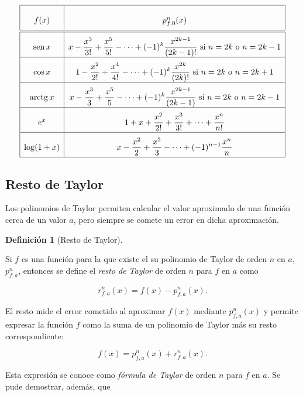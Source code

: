 \documentclass[
  a4paper,
]{scrreport}
\theoremstyle{plain}
\theoremstyle{plain}
\theoremstyle{definition}
\newtheorem{definition}{Definición}[chapter]
\theoremstyle{definition}
\theoremstyle{plain}
\theoremstyle{remark}
\begin{document}
\[
\renewcommand{\arraystretch}{2.5}
\begin{array}{|c|c|}
\hline
f(x) & p_{f,0}^n(x) \\
\hline\hline
\operatorname{sen} x & \displaystyle x-\frac{x^3}{3!}+\frac{x^5}{5!}-\cdots +(-1)^k\frac{x^{2k-1}}{(2k-1)!} \mbox{ si $n=2k$ o $n=2k-1$}\\
\hline
\cos x &  \displaystyle 1-\frac{x^2}{2!}+\frac{x^4}{4!}-\cdots +(-1)^k\frac{x^{2k}}{(2k)!} \mbox{ si $n=2k$ o $n=2k+1$}\\
\hline
\operatorname{arctg} x &  \displaystyle x-\frac{x^3}{3}+\frac{x^5}{5}-\cdots +(-1)^k\frac{x^{2k-1}}{(2k-1)} \mbox{ si $n=2k$ o $n=2k-1$}\\
\hline
e^x & \displaystyle 1+x+\frac{x^2}{2!}+\frac{x^3}{3!}+\cdots + \frac{x^n}{n!}\\
\hline
\log(1+x) & \displaystyle x-\frac{x^2}{2}+\frac{x^3}{3}-\cdots +(-1)^{n-1}\frac{x^n}{n}\\
\hline
\end{array}
\]

\hypertarget{sec-resto-taylor}{%
\subsection{Resto de Taylor}\label{sec-resto-taylor}}

Los polinomios de Taylor permiten calcular el valor aproximado de una
función cerca de un valor \(a\), pero siempre se comete un error en
dicha aproximación.

\leavevmode{}%
\begin{definition}[Resto de Taylor]\label{def-resto-taylor}

Si \(f\) es una función para la que existe el su polinomio de Taylor de
orden \(n\) en \(a\), \(p_{f,a}^n\), entonces se define el \emph{resto
de Taylor} de orden \(n\) para \(f\) en \(a\) como

\[
r_{f,a}^n(x)=f(x)-p_{f,a}^n(x).
\]

\end{definition}

El resto mide el error cometido al aproximar \(f(x)\) mediante
\(p_{f,a}^n(x)\) y permite expresar la función \(f\) como la suma de un
polinomio de Taylor más su resto correspondiente:

\[
f(x)=p_{f,a}^n(x) + r_{f,a}^n(x).
\]

Esta expresión se conoce como \emph{fórmula de Taylor} de orden \(n\)
para \(f\) en \(a\). Se pude demostrar, además, que
\end{document}
